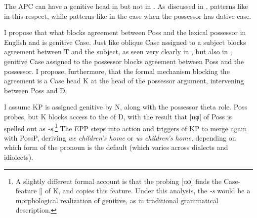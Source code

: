 \documentclass[output=paper]{langsci/langscibook}
\begin{document}
The \gls{APC} can have a genitive head in  but not in . As
discussed in ,  patterns like  in this
respect, while  patterns like  in the case when the possessor
has dative case.

I propose that what blocks agreement between Poss and the lexical possessor in
English and  is genitive Case. Just like oblique Case
assigned to a subject blocks agreement between T and the subject, as seen very
clearly in  \citep{Thrainsson2007}, but also in 
\parencites{LaitinenVilkuna1993}[209--210]{Holmberg2010b}, genitive Case assigned to the possessor blocks agreement between Poss and the
possessor. I propose, furthermore, that the formal mechanism blocking the
agreement is a Case head K at the head of the possessor argument, intervening
between Poss and D.

\ea\label{ex:16.45}
\z

I assume KP is assigned genitive by N, along with the possessor theta role.
Poss probes, but K blocks access to the  of D, with the result that
[uφ] of Poss is spelled out as \emph{-s}.\footnote{ A slightly different formal
account is that the probing [uφ] finds the Case-feature [\Gen{}] of K, and
copies this feature. Under this analysis, the \emph{-s} would be a
morphological realization of genitive, as in traditional grammatical
description.} The \gls{EPP} steps into action and triggers  of KP to merge
again with PossP, deriving \emph{we children’s home} or \emph{us children’s
home}, depending on which form of the pronoun is the default (which varies
across dialects and idiolects).
\end{document}
